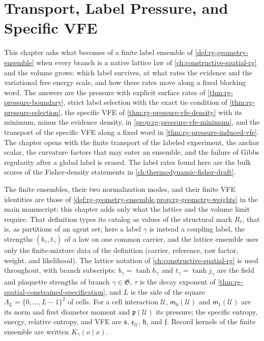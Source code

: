 \chapter{Transport, Label Pressure, and Specific VFE}
\label{ch:normalized-geometry}
\label{ch:geometry-pressure}

This chapter asks what becomes of a finite label ensemble of
\cref{def:rg-geometry-ensemble} when every branch is a native lattice law of
\cref{ch:constructive-spatial-rg} and the volume grows: which label survives,
at what rates the evidence and the variational free energy scale, and how
these rates move along a fixed blocking word. The answers are the pressure
with explicit surface rates of \cref{thm:rg-pressure-boundary}, strict label
selection with the exact tie condition of \cref{thm:rg-pressure-selection},
the specific VFE of \cref{thm:rg-pressure-vfe-density} with its minimum,
minus the evidence density, in \cref{prop:rg-pressure-vfe-minimum}, and the
transport of the specific VFE along a fixed word in
\cref{thm:rg-pressure-induced-vfe}. The chapter opens with the finite
transport of the labeled experiment, the anchor scalar, the curvature
factors that may enter an ensemble, and the failure of Gibbs regularity after
a global label is erased. The label rates found here are the bulk scores of
the Fisher-density statements in \cref{ch:thermodynamic-fisher-draft}.

The finite ensembles, their two normalization modes, and their finite VFE
identities are those of \cref{def:rg-geometry-ensemble,prop:rg-geometry-weights}
in the main manuscript; this chapter adds only what the lattice and the
volume limit require. That definition types its catalog as values of the
structural mark $R_\ell$, that is, as partitions of an agent set; here a label
$\gamma$ is instead a coupling label, the strengths $(b_\gamma,t_\gamma)$ of a
law on one common carrier, and the lattice ensemble uses only the
finite-mixture data of the definition (carrier, reference, raw factor,
weight, and likelihood). The lattice notation of
\cref{ch:constructive-spatial-rg} is used throughout, with branch subscripts:
$b_\gamma=\tanh h_\gamma$ and $t_\gamma=\tanh j_\gamma$ are the field and
plaquette strengths of branch $\gamma\in\mathfrak G$, $\tau$ is the decay
exponent of \cref{thm:rg-spatial-constrained-specification}, and $L$ is the
side of the square $\Lambda_L=\{0,\ldots,L-1\}^2$ of cells. For a cell
interaction $\mathscr U$, $\mathsf m_0(\mathscr U)$ and $\mathsf m_1(\mathscr U)$ are its norm
and first diameter moment and $\mathfrak p(\mathscr U)$ its pressure; the specific
entropy, energy, relative entropy, and VFE are $\mathfrak s$,
$\mathfrak e_{\mathscr U}$, $\mathfrak h$, and $\mathfrak f$. Record kernels of the
finite ensemble are written $K_\gamma(o\mid x)$.

